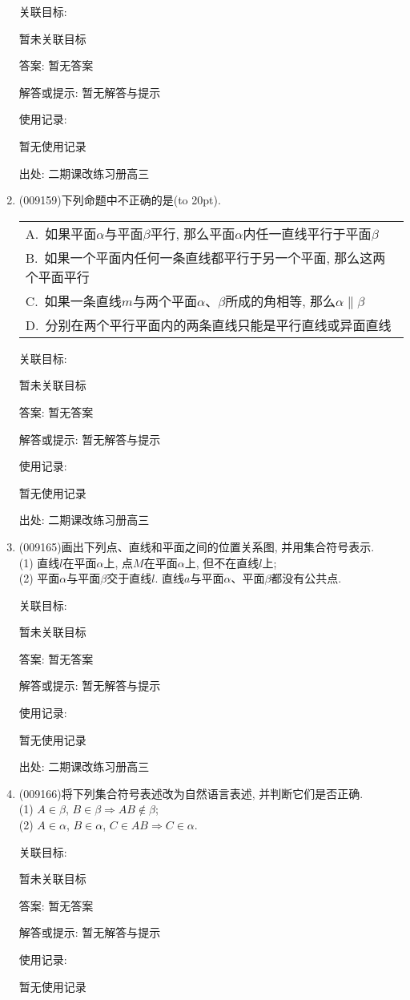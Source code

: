 \documentclass[10pt,a4paper]{article}
\newcommand{\bracket}[1]{(\hbox to #1pt{})}
\newcommand{\onech}[4]{\par\begin{tabular}{p{.9\textwidth}}
A.~#1\\
B.~#2\\
C.~#3\\
D.~#4
\end{tabular}}
\begin{document}
\begin{enumerate}[1.]
关联目标:

暂未关联目标

答案: 暂无答案

解答或提示: 暂无解答与提示

使用记录:

暂无使用记录


出处: 二期课改练习册高三
\item { (009159)}下列命题中不正确的是\bracket{20}.
\onech{如果平面$\alpha$与平面$\beta$平行, 那么平面$\alpha$内任一直线平行于平面$\beta$}{如果一个平面内任何一条直线都平行于另一个平面, 那么这两个平面平行}{如果一条直线$m$与两个平面$\alpha$、$\beta$所成的角相等, 那么$\alpha \parallel\beta$}{分别在两个平行平面内的两条直线只能是平行直线或异面直线}


关联目标:

暂未关联目标

答案: 暂无答案

解答或提示: 暂无解答与提示

使用记录:

暂无使用记录


出处: 二期课改练习册高三
\item { (009165)}画出下列点、直线和平面之间的位置关系图, 并用集合符号表示.\\
(1) 直线$l$在平面$\alpha$上, 点$M$在平面$\alpha$上, 但不在直线$l$上;\\
(2) 平面$\alpha$与平面$\beta$交于直线$l$. 直线$a$与平面$\alpha$、平面$\beta$都没有公共点.


关联目标:

暂未关联目标

答案: 暂无答案

解答或提示: 暂无解答与提示

使用记录:

暂无使用记录


出处: 二期课改练习册高三
\item { (009166)}将下列集合符号表述改为自然语言表述, 并判断它们是否正确.\\
(1) $A\in \beta$, $B\in \beta \Rightarrow AB\not\in \beta$;\\
(2) $A\in \alpha$, $B\in \alpha$, $C\in AB\Rightarrow C\in \alpha$.


关联目标:

暂未关联目标

答案: 暂无答案

解答或提示: 暂无解答与提示

使用记录:

暂无使用记录



\end{enumerate}
\end{document}
